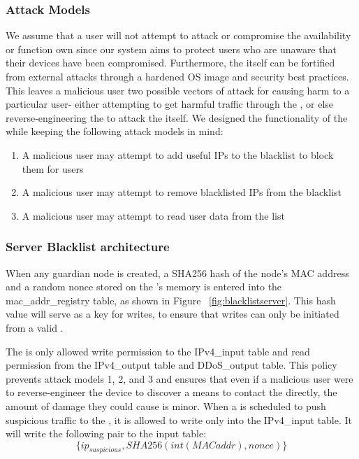 \subsubsection{Attack Models}
\label{sec:design:attacks}
We assume that a user will not attempt to attack or compromise the availability or function own \nodename since our system aims to protect users who are unaware that their devices have been compromised. Furthermore, the \nodename itself can be fortified from external attacks through a hardened OS image and security best practices. This leaves a malicious user two possible vectors of attack for causing harm to a particular user- either attempting to get harmful traffic through the \nodename, or else reverse-engineering the \nodename to attack the \servname itself. 
We designed the functionality of the \servname while keeping the following attack models in mind:

\begin{enumerate}
\item A malicious user may attempt to add useful IPs to the blacklist to block them for users
\item A malicious user may attempt to remove blacklisted IPs from the blacklist
\item A malicious user may attempt to read user data from the list
\end{enumerate}

\subsubsection{Server Blacklist architecture}
\label{sec:design:blacklist}
When any guardian node is created, a SHA256 hash of the node's MAC address and a random nonce stored on the \nodename's memory is entered into the mac_addr_registry table, as shown in Figure ~\ref{fig:blacklistserver}. This hash value will serve as a key for writes, to ensure that writes can only be initiated from a valid \nodename.

The \nodename is only allowed write permission to the IPv4_input table and read permission from the IPv4_output table and DDoS_output table. This policy prevents attack models 1, 2, and 3 and ensures that even if a malicious user were to reverse-engineer the device to discover a means to contact the \servname directly, the amount of damage they could cause is minor. When a \nodename is scheduled to push suspicious traffic to the \servname, it is allowed to write only into the IPv4_input table. It will write the following pair to the input table: \[\{ip_{suspicious}, SHA256(int(MAC addr), nonce)\}\] 

